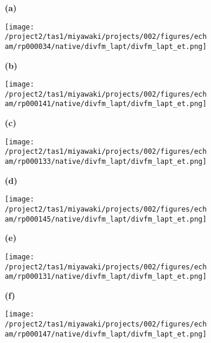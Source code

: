 \documentclass[preview]{standalone}
\begin{document}
\begin{figure}
  \begin{subfigure}[t]{0.05\textwidth}
    \textbf{\normalsize{(a)}}
  \end{subfigure}
  \begin{subfigure}[t]{0.45\textwidth}
    \texttt{[image: /project2/tas1/miyawaki/projects/002/figures/echam/rp000034/native/divfm\_lapt/divfm\_lapt\_et.png]}
  \end{subfigure}
  \begin{subfigure}[t]{0.05\textwidth}
    \textbf{\normalsize{(b)}}
  \end{subfigure}
  \begin{subfigure}[t]{0.45\textwidth}
    \texttt{[image: /project2/tas1/miyawaki/projects/002/figures/echam/rp000141/native/divfm\_lapt/divfm\_lapt\_et.png]}
  \end{subfigure}
  
  \begin{subfigure}[t]{0.05\textwidth}
    \textbf{\normalsize{(c)}}
  \end{subfigure}
  \begin{subfigure}[t]{0.45\textwidth}
    \texttt{[image: /project2/tas1/miyawaki/projects/002/figures/echam/rp000133/native/divfm\_lapt/divfm\_lapt\_et.png]}
  \end{subfigure}
  \begin{subfigure}[t]{0.05\textwidth}
    \textbf{\normalsize{(d)}}
  \end{subfigure}
  \begin{subfigure}[t]{0.45\textwidth}
    \texttt{[image: /project2/tas1/miyawaki/projects/002/figures/echam/rp000145/native/divfm\_lapt/divfm\_lapt\_et.png]}
  \end{subfigure}
  
  \begin{subfigure}[t]{0.05\textwidth}
    \textbf{\normalsize{(e)}}
  \end{subfigure}
  \begin{subfigure}[t]{0.45\textwidth}
    \texttt{[image: /project2/tas1/miyawaki/projects/002/figures/echam/rp000131/native/divfm\_lapt/divfm\_lapt\_et.png]}
  \end{subfigure}
  \begin{subfigure}[t]{0.05\textwidth}
    \textbf{\normalsize{(f)}}
  \end{subfigure}
  \begin{subfigure}[t]{0.45\textwidth}
    \texttt{[image: /project2/tas1/miyawaki/projects/002/figures/echam/rp000147/native/divfm\_lapt/divfm\_lapt\_et.png]}
  \end{subfigure}


\end{figure}
\end{document}
